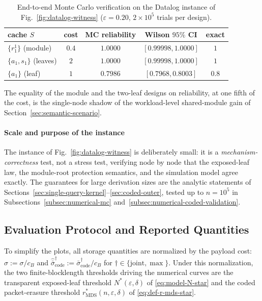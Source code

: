 \documentclass[journal]{IEEEtran}
\numberwithin{equation}{section}
\begin{document}
\begin{table}[t]
\caption{End-to-end Monte Carlo verification on the Datalog instance of
Fig.~\ref{fig:datalog-witness} (\(\varepsilon=0.20\), \(2\times10^{5}\)
trials per design).}
\label{tab:datalog-closure}
\centering
\setlength{\tabcolsep}{4pt}
\begin{tabular}{@{}lcccc@{}}
\toprule
cache \(S\) & cost & MC reliability & Wilson \(95\%\) CI & exact \\
\midrule
\(\{r_{1}^{1}\}\) (module) & \(0.4\) & \(1.0000\) & \([0.99998,1.0000]\) & \(1\) \\
\(\{a_{1},s_{1}\}\) (leaves) & \(2\) & \(1.0000\) & \([0.99998,1.0000]\) & \(1\) \\
\(\{a_{1}\}\) (leaf) & \(1\) & \(0.7986\) & \([0.7968,0.8003]\) & \(0.8\) \\
\bottomrule
\end{tabular}
\end{table}

The equality of the module and the two-leaf designs on reliability, at one
fifth of the cost, is the single-node shadow of the workload-level
shared-module gain of Section~\ref{sec:semantic-scenario}.

\paragraph*{Scale and purpose of the instance}
The instance of Fig.~\ref{fig:datalog-witness} is deliberately small: it is
a \emph{mechanism-correctness} test, not a stress test, verifying node by
node that the exposed-leaf law, the module-root protection semantics, and
the simulation model agree exactly.  The guarantees for large derivation
sizes are the analytic statements of
Sections~\ref{sec:single-query-kernel}--\ref{sec:coded-outer}, tested up to
\(n=10^{5}\) in Subsections~\ref{subsec:numerical-mc}
and~\ref{subsec:numerical-coded-validation}.

\subsection{Evaluation Protocol and Reported Quantities}
\label{subsec:numerical-protocol}

To simplify the plots, all storage quantities are normalized by the payload
cost: \(\widehat{\sigma}:=\sigma/c_B\) and
\(\widehat{\bar{\sigma}}_{\mathrm{code}}^{\dagger}
:=\bar{\sigma}_{\mathrm{code}}^{\dagger}/c_B\) for
\(\dagger\in\{\mathrm{joint},\max\}\).
Under this normalization, the two finite-blocklength thresholds
driving the numerical curves are the transparent exposed-leaf threshold
\(N^{*}(\varepsilon,\delta)\) of \eqref{eq:model-N-star} and the coded
packet-erasure threshold \(r_{\mathrm{MDS}}^{*}(n,\varepsilon,\delta)\) of
\eqref{eq:def-r-mds-star}.
\end{document}
